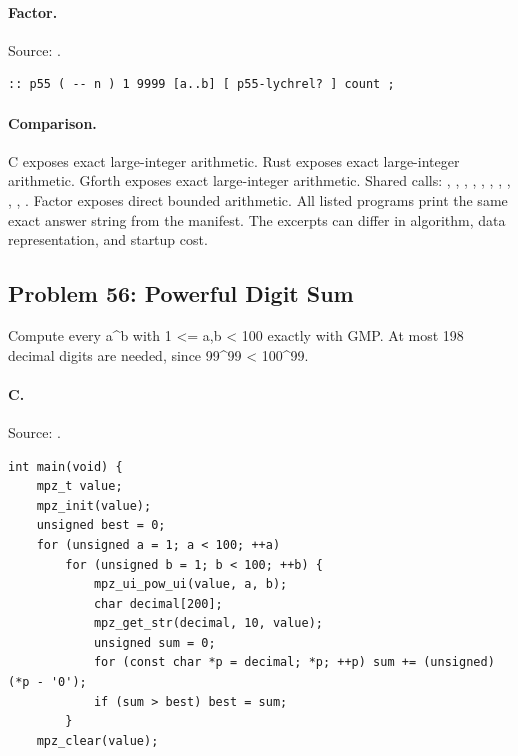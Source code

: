 \paragraph{Factor.} Source: .
\begin{lstlisting}
:: p55 ( -- n ) 1 9999 [a..b] [ p55-lychrel? ] count ;
\end{lstlisting}

\paragraph{Comparison.}
C exposes exact large-integer arithmetic. Rust exposes exact large-integer arithmetic. Gforth exposes exact large-integer arithmetic. Shared calls: \texttt{}, \texttt{}, \texttt{}, \texttt{}, \texttt{}, \texttt{}, \texttt{}, \texttt{}, \texttt{}, \texttt{}, \texttt{}. Factor exposes direct bounded arithmetic.
All listed programs print the same exact answer string from the manifest. The excerpts can differ in algorithm, data representation, and startup cost.

\subsection{Problem 56: Powerful Digit Sum}
\label{walkthrough:p56}
Compute every a\textasciicircum{}b with 1 <= a,b < 100 exactly with GMP. At most 198 decimal digits are needed, since 99\textasciicircum{}99 < 100\textasciicircum{}99.

\paragraph{C.} Source: .
\begin{lstlisting}
int main(void) {
    mpz_t value;
    mpz_init(value);
    unsigned best = 0;
    for (unsigned a = 1; a < 100; ++a)
        for (unsigned b = 1; b < 100; ++b) {
            mpz_ui_pow_ui(value, a, b);
            char decimal[200];
            mpz_get_str(decimal, 10, value);
            unsigned sum = 0;
            for (const char *p = decimal; *p; ++p) sum += (unsigned)(*p - '0');
            if (sum > best) best = sum;
        }
    mpz_clear(value);
\end{lstlisting}

